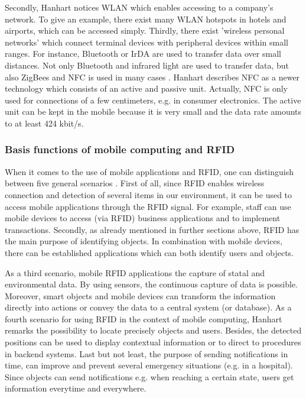 Secondly, Hanhart notices \ac{WLAN} which enables accessing to a company's network. To give an example, there exist many WLAN hotspots in hotels and airports, which can be accessed simply. Thirdly, there exist 'wireless personal networks' which connect terminal devices with peripheral devices within small ranges. For instance, Bluetooth or \ac{IrDA} are used to transfer data over small distances. Not only Bluetooth and infrared light are used to transfer data, but also ZigBees and \ac{NFC} is used in many cases \cite[p.12-13]{mobile}. Hanhart describes NFC as a newer technology which consists of an active and passive unit. Actually, NFC is only used for connections of a few centimeters, e.g. in consumer electronics. The active unit can be kept in the mobile because it is very small and the data rate amounts to at least 424 kbit/s.
 
\subsubsection{Basis functions of mobile computing and RFID}

When it comes to the use of mobile applications and RFID, one can distinguish between five general scenarios \cite[p.13 ff.]{mobile}. First of all, since RFID enables wireless connection and detection of several items in our environment, it can be used to access mobile applications through the RFID signal. For example, staff can use mobile devices to access (via RFID) business applications and to implement transactions. Secondly, as already mentioned in further sections above, RFID has the main purpose of identifying objects. In combination with mobile devices, there can be established applications which can both identify users and objects.

As a third scenario, mobile RFID applications the capture of statal and environmental data. By using sensors, the continuous capture of data is possible. Moreover, smart objects and mobile devices can transform the information directly into actions or convey the data to a central system (or database). As a fourth scenario for using RFID in the context of mobile computing, Hanhart \cite[p.13 ff.]{mobile} remarks the possibility to locate precisely objects and users. Besides, the detected positions can be used to display contextual information or to direct to procedures in backend systems. Last but not least, the purpose of sending notifications in time, can improve and prevent several emergency situations (e.g. in a hospital). Since objects can send notifications e.g. when reaching a certain state, users get information everytime and everywhere.  

